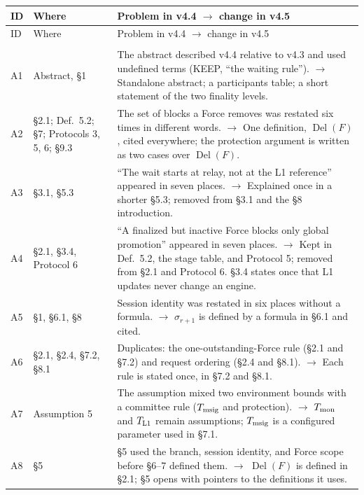\documentclass[11pt,a4paper]{article}
\newcommand{\Chg}[1]{\leavevmode\hypertarget{chg:#1}{#1}}
\newcommand{\Del}{\operatorname{Del}}
\begin{document}
\begingroup\small
\begin{xltabular}{\linewidth}{@{}>{\raggedright\arraybackslash}p{.05\linewidth}>{\raggedright\arraybackslash}p{.17\linewidth}Y@{}}
\toprule
ID & Where & Problem in v4.4 $\rightarrow$ change in v4.5\\
\midrule
\endfirsthead
\toprule
ID & Where & Problem in v4.4 $\rightarrow$ change in v4.5\\
\midrule
\endhead
\bottomrule
\endfoot
{}\\
\Chg{A1} & Abstract, \S1 & The abstract described v4.4 relative to v4.3 and used undefined terms (KEEP, ``the waiting rule''). $\rightarrow$ Standalone abstract; a participants table; a short statement of the two finality levels.\\
\Chg{A2} & \S2.1; Def.~5.2; \S7; Protocols 3, 5, 6; \S9.3 & The set of blocks a Force removes was restated six times in different words. $\rightarrow$ One definition, $\Del(F)$, cited everywhere; the protection argument is written as two cases over $\Del(F)$.\\
\Chg{A3} & \S3.1, \S5.3 & ``The wait starts at relay, not at the L1 reference'' appeared in seven places. $\rightarrow$ Explained once in a shorter \S5.3; removed from \S3.1 and the \S8 introduction.\\
\Chg{A4} & \S2.1, \S3.4, Protocol 6 & ``A finalized but inactive Force blocks only global promotion'' appeared in seven places. $\rightarrow$ Kept in Def.~5.2, the stage table, and Protocol 5; removed from \S2.1 and Protocol 6. \S3.4 states once that L1 updates never change an engine.\\
\Chg{A5} & \S1, \S6.1, \S8 & Session identity was restated in six places without a formula. $\rightarrow$ $\sigma_{r+1}$ is defined by a formula in \S6.1 and cited.\\
\Chg{A6} & \S2.1, \S2.4, \S7.2, \S8.1 & Duplicates: the one-outstanding-Force rule (\S2.1 and \S7.2) and request ordering (\S2.4 and \S8.1). $\rightarrow$ Each rule is stated once, in \S7.2 and \S8.1.\\
\Chg{A7} & Assumption 5 & The assumption mixed two environment bounds with a committee rule ($T_{\rm msig}$ and protection). $\rightarrow$ $T_{\rm mon}$ and $T_{\rm L1}$ remain assumptions; $T_{\rm msig}$ is a configured parameter used in \S7.1.\\
\Chg{A8} & \S5 & \S5 used the branch, session identity, and Force scope before \S6--7 defined them. $\rightarrow$ $\Del(F)$ is defined in \S2.1; \S5 opens with pointers to the definitions it uses.\\

\end{xltabular}
\end{document}
